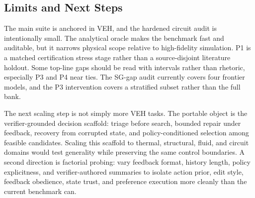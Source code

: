 \subsection{Limits and Next Steps}

The main suite is anchored in VEH, and the hardened circuit audit is intentionally small. The analytical oracle makes the benchmark fast and auditable, but it narrows physical scope relative to high-fidelity simulation. P1 is a matched certification stress stage rather than a source-disjoint literature holdout. Some top-line gaps should be read with intervals rather than rhetoric, especially P3 and P4 near ties. The SG-gap audit currently covers four frontier models, and the P3 intervention covers a stratified subset rather than the full bank.

The next scaling step is not simply more VEH tasks. The portable object is the verifier-grounded decision scaffold: triage before search, bounded repair under feedback, recovery from corrupted state, and policy-conditioned selection among feasible candidates. Scaling this scaffold to thermal, structural, fluid, and circuit domains would test generality while preserving the same control boundaries. A second direction is factorial probing: vary feedback format, history length, policy explicitness, and verifier-authored summaries to isolate action prior, edit style, feedback obedience, state trust, and preference execution more cleanly than the current benchmark can.

